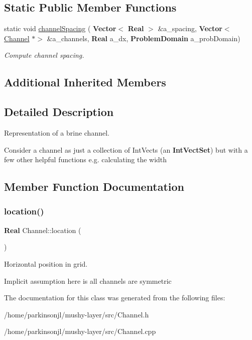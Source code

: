 \subsection*{Static Public Member Functions}
\begin{DoxyCompactItemize}
\item 
\mbox{\label{class_channel_ab37d46ac056894585d805a019191634d}} 
static void \hyperlink{class_channel_ab37d46ac056894585d805a019191634d}{channel\+Spacing} (\textbf{ Vector}$<$ \textbf{ Real} $>$ \&a\+\_\+spacing, \textbf{ Vector}$<$ \hyperlink{class_channel}{Channel} $\ast$$>$ \&a\+\_\+channels, \textbf{ Real} a\+\_\+dx, \textbf{ Problem\+Domain} a\+\_\+prob\+Domain)
\begin{DoxyCompactList}\small\item\em Compute channel spacing. \end{DoxyCompactList}\end{DoxyCompactItemize}
\subsection*{Additional Inherited Members}


\subsection{Detailed Description}
Representation of a brine channel. 

Consider a channel as just a collection of Int\+Vects (an \textbf{ Int\+Vect\+Set}) but with a few other helpful functions e.\+g. calculating the width 

\subsection{Member Function Documentation}
\mbox{\label{class_channel_abaeb092cb3b9705a69f6c1bb26d50aa4}} 
\subsubsection{\texorpdfstring{location()}{location()}}
{\footnotesize\ttfamily \textbf{ Real} Channel\+::location (\begin{DoxyParamCaption}{ }\end{DoxyParamCaption})}



Horizontal position in grid. 

Implicit assumption here is all channels are symmetric 

The documentation for this class was generated from the following files\+:\begin{DoxyCompactItemize}
\item 
/home/parkinsonjl/mushy-\/layer/src/Channel.\+h\item 
/home/parkinsonjl/mushy-\/layer/src/Channel.\+cpp\end{DoxyCompactItemize}
